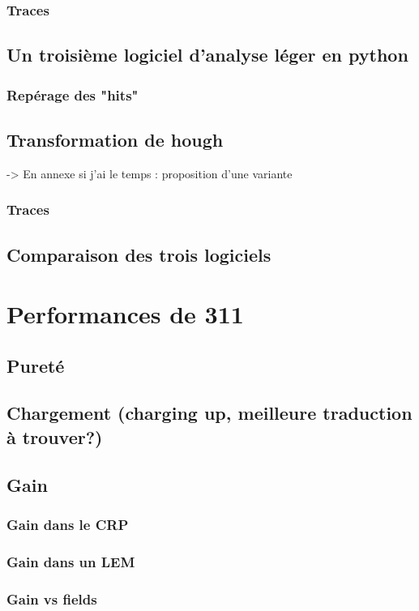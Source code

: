      \subsubsection{Traces}
    \subsection{Un troisième logiciel d'analyse léger en python}\label{sec::rawdatasoft}
      \subsubsection{Repérage des "hits"}
        \subsection{Transformation de hough}
                -> En annexe si j'ai le temps : proposition d'une variante
      \subsubsection{Traces}
    \subsection{Comparaison des trois logiciels}
        
    \section{Performances de 311}
    \subsection{Pureté}
    \subsection{Chargement (charging up, meilleure traduction à trouver?)}
    \subsection{Gain}
      \subsubsection{Gain dans le CRP}
      \subsubsection{Gain dans un LEM}
      \subsubsection{Gain vs fields}
